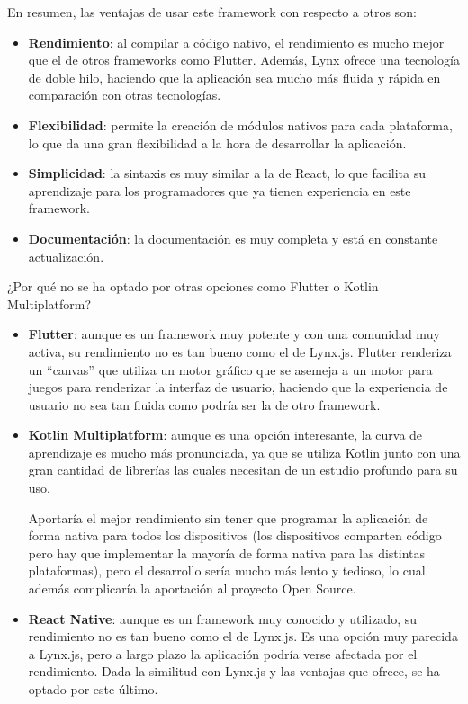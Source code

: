 En resumen, las ventajas de usar este framework con respecto a otros son:
\begin{itemize}
    \item \textbf{Rendimiento}: al compilar a código nativo, el rendimiento es mucho mejor que el de otros frameworks como Flutter. Además, Lynx ofrece una tecnología de doble hilo, haciendo que la aplicación sea mucho más fluida y rápida en comparación con otras tecnologías.
    \item \textbf{Flexibilidad}: permite la creación de módulos nativos para cada plataforma, lo que da una gran flexibilidad a la hora de desarrollar la aplicación.
    \item \textbf{Simplicidad}: la sintaxis es muy similar a la de React, lo que facilita su aprendizaje para los programadores que ya tienen experiencia en este framework.
    \item \textbf{Documentación}: la documentación es muy completa y está en constante actualización.
\end{itemize}

¿Por qué no se ha optado por otras opciones como Flutter o Kotlin Multiplatform?
\begin{itemize}
    \item \textbf{Flutter}: aunque es un framework muy potente y con una comunidad muy activa, su rendimiento no es tan bueno como el de Lynx.js.
        Flutter renderiza un ``canvas'' que utiliza un motor gráfico que se asemeja a un motor para juegos para renderizar la interfaz de usuario, haciendo que la experiencia de usuario no sea tan fluida como podría ser la de otro framework.
    \item \textbf{Kotlin Multiplatform}: aunque es una opción interesante, la curva de aprendizaje es mucho más pronunciada, ya que se utiliza Kotlin junto con una gran cantidad de librerías las cuales necesitan de un estudio profundo para su uso. 

        Aportaría el mejor rendimiento sin tener que programar la aplicación de forma nativa para todos los dispositivos (los dispositivos comparten código pero hay que implementar la mayoría de forma nativa para las distintas plataformas), pero el desarrollo sería mucho más lento y tedioso, lo cual además complicaría la aportación al proyecto Open Source.
    \item \textbf{React Native}: aunque es un framework muy conocido y utilizado, su rendimiento no es tan bueno como el de Lynx.js.
        Es una opción muy parecida a Lynx.js, pero a largo plazo la aplicación podría verse afectada por el rendimiento.
        Dada la similitud con Lynx.js y las ventajas que ofrece, se ha optado por este último.
\end{itemize}

